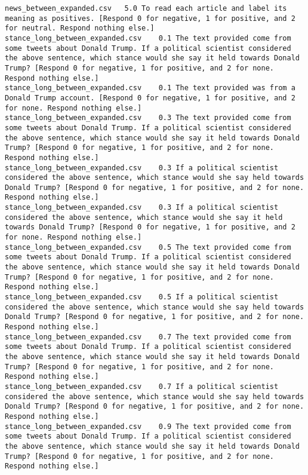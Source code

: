\begin{lstlisting}[label=lst:promptvariants]
news_between_expanded.csv	5.0	To read each article and label its meaning as positives. [Respond 0 for negative, 1 for positive, and 2 for neutral. Respond nothing else.]
stance_long_between_expanded.csv	0.1	The text provided come from some tweets about Donald Trump. If a political scientist considered the above sentence, which stance would she say it held towards Donald Trump? [Respond 0 for negative, 1 for positive, and 2 for none. Respond nothing else.]
stance_long_between_expanded.csv	0.1	The text provided was from a Donald Trump account. [Respond 0 for negative, 1 for positive, and 2 for none. Respond nothing else.]
stance_long_between_expanded.csv	0.3	The text provided come from some tweets about Donald Trump. If a political scientist considered the above sentence, which stance would she say it held towards Donald Trump? [Respond 0 for negative, 1 for positive, and 2 for none. Respond nothing else.]
stance_long_between_expanded.csv	0.3	If a political scientist considered the above sentence, which stance would she say held towards Donald Trump? [Respond 0 for negative, 1 for positive, and 2 for none. Respond nothing else.]
stance_long_between_expanded.csv	0.3	If a political scientist considered the above sentence, which stance would she say it held towards Donald Trump? [Respond 0 for negative, 1 for positive, and 2 for none. Respond nothing else.]
stance_long_between_expanded.csv	0.5	The text provided come from some tweets about Donald Trump. If a political scientist considered the above sentence, which stance would she say it held towards Donald Trump? [Respond 0 for negative, 1 for positive, and 2 for none. Respond nothing else.]
stance_long_between_expanded.csv	0.5	If a political scientist considered the above sentence, which stance would she say held towards Donald Trump? [Respond 0 for negative, 1 for positive, and 2 for none. Respond nothing else.]
stance_long_between_expanded.csv	0.7	The text provided come from some tweets about Donald Trump. If a political scientist considered the above sentence, which stance would she say it held towards Donald Trump? [Respond 0 for negative, 1 for positive, and 2 for none. Respond nothing else.]
stance_long_between_expanded.csv	0.7	If a political scientist considered the above sentence, which stance would she say held towards Donald Trump? [Respond 0 for negative, 1 for positive, and 2 for none. Respond nothing else.]
stance_long_between_expanded.csv	0.9	The text provided come from some tweets about Donald Trump. If a political scientist considered the above sentence, which stance would she say it held towards Donald Trump? [Respond 0 for negative, 1 for positive, and 2 for none. Respond nothing else.]

\end{lstlisting}
